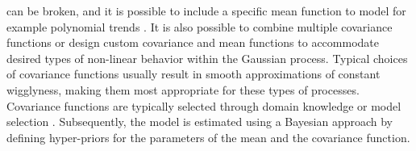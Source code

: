 can be broken, and it is possible to include a specific mean function to model
for example polynomial trends \parencite{ohagan_curve_1978, hwang_how_2023,
    blight_bayesian_1975}. It is also possible to combine multiple covariance
functions or design custom covariance and mean functions
to accommodate desired types of non-linear behavior within the
Gaussian process. Typical choices of covariance functions usually result
in smooth approximations of constant wigglyness, making them most appropriate
for these types of processes.
Covariance functions are typically selected through domain
knowledge or model selection \parencite{richardson_gaussian_2017,
    abdessalem_automatic_2017}. Subsequently, the model is estimated using a
Bayesian
approach by defining hyper-priors for the parameters of the mean and the
covariance function.